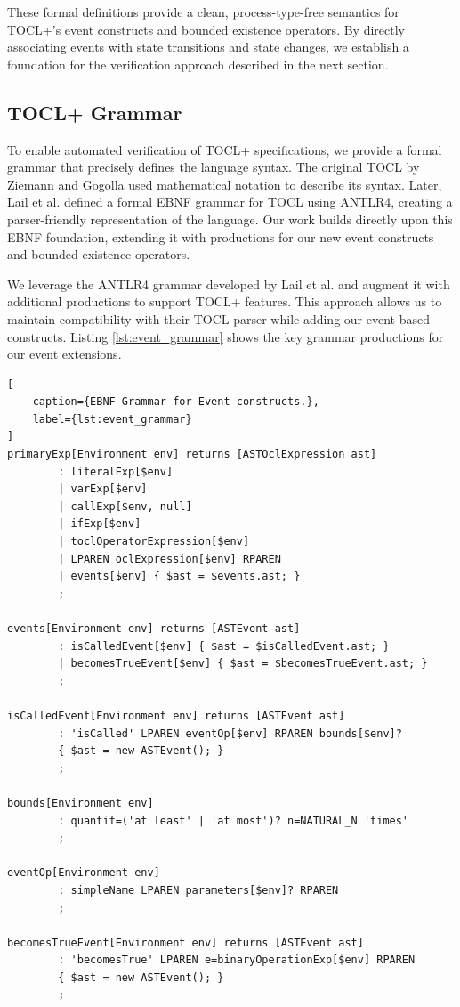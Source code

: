 These formal definitions provide a clean, process-type-free semantics for TOCL+'s 
event constructs and bounded existence operators. By directly associating events with 
state transitions and state changes, we establish a foundation for the verification 
approach described in the next section.


\subsection{TOCL+ Grammar}

\hspace{1cm} To enable automated verification of TOCL+ specifications, we provide a 
formal grammar that precisely defines the language syntax. The original TOCL by 
Ziemann and Gogolla used mathematical notation to describe its syntax. 
Later, Lail et al. \cite{TOCL2OCL} defined a formal EBNF grammar for TOCL using ANTLR4, 
creating a parser-friendly representation of the language. Our work builds directly 
upon this EBNF foundation, extending it with productions for our new event constructs 
and bounded existence operators.

We leverage the ANTLR4 grammar developed by Lail et al. and augment it with 
additional productions to support TOCL+ features. This approach allows us to 
maintain compatibility with their TOCL parser while adding our event-based 
constructs. Listing \ref{lst:event_grammar} shows the key grammar productions 
for our event extensions.

\begin{lstlisting}[
    caption={EBNF Grammar for Event constructs.}, 
    label={lst:event_grammar}
]
primaryExp[Environment env] returns [ASTOclExpression ast]
        : literalExp[$env]
        | varExp[$env]
        | callExp[$env, null]
        | ifExp[$env]
        | toclOperatorExpression[$env]
        | LPAREN oclExpression[$env] RPAREN
        | events[$env] { $ast = $events.ast; }
        ;

events[Environment env] returns [ASTEvent ast]
        : isCalledEvent[$env] { $ast = $isCalledEvent.ast; }
        | becomesTrueEvent[$env] { $ast = $becomesTrueEvent.ast; }
        ;

isCalledEvent[Environment env] returns [ASTEvent ast]
        : 'isCalled' LPAREN eventOp[$env] RPAREN bounds[$env]?
        { $ast = new ASTEvent(); }
        ;

bounds[Environment env]
        : quantif=('at least' | 'at most')? n=NATURAL_N 'times'
        ;

eventOp[Environment env]
        : simpleName LPAREN parameters[$env]? RPAREN
        ;

becomesTrueEvent[Environment env] returns [ASTEvent ast]
        : 'becomesTrue' LPAREN e=binaryOperationExp[$env] RPAREN
        { $ast = new ASTEvent(); }
        ;
\end{lstlisting}

